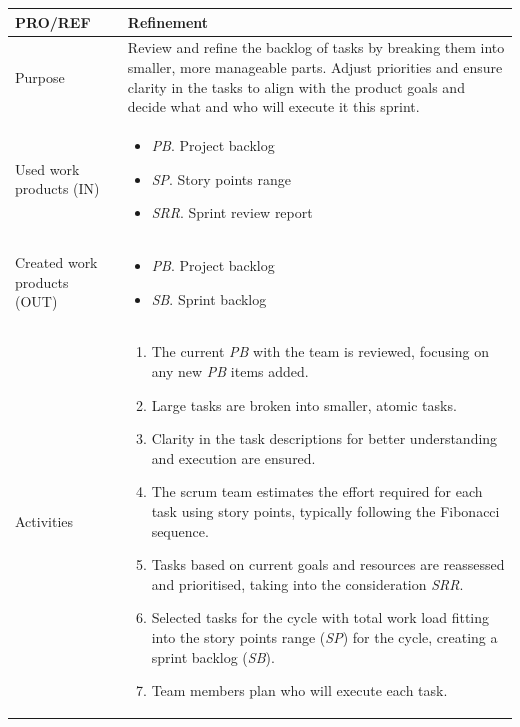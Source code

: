 \begin{table}[h!]
\begin{tabular}{l|p{}}
\hline
\textbf{PRO/REF}        & \textbf{Refinement} \\ \hline
Purpose & Review and refine the backlog of tasks by breaking them into smaller, more manageable parts. Adjust priorities and ensure clarity in the tasks to align with the product goals and decide what and who will execute it this sprint. \\ \hline
Used work products (IN)   &      
\begin{itemize}
    \item \textit{PB}. Project backlog
    \item \textit{SP}. Story points range
    \item \textit{SRR}. Sprint review report
\end{itemize}
\\ \hline
Created work products (OUT) &     
\begin{itemize}
    \item \textit{PB}. Project backlog
    \item \textit{SB}. Sprint backlog
\end{itemize}
\\ \hline
Activities            &   
\begin{enumerate}
    \item The current \textit{PB} with the team is reviewed, focusing on any new \textit{PB} items added.
    \item Large tasks are broken into smaller, atomic tasks.
    \item Clarity in the task descriptions for better understanding and execution are ensured.
    \item The scrum team  estimates the effort required for each task using story points, typically following the Fibonacci sequence.
    \item Tasks based on current goals and resources are reassessed and prioritised, taking into the consideration \textit{SRR}.
    \item Selected tasks for the cycle with total work load fitting into the story points range (\textit{SP}) for the cycle, creating a sprint backlog (\textit{SB}).
    \item Team members plan who will execute each task.  
\end{enumerate}
\end{tabular}
\label{PRO/REF}
\end{table}

